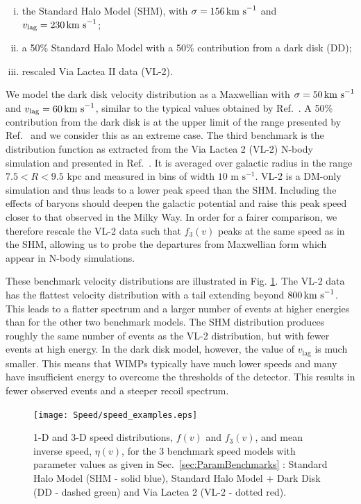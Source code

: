 \begin{enumerate}[(i)]
\item the Standard Halo Model (SHM), with \(\sigma = 156 \,\textrm{km s}^{-1}\) and \(v_\textrm{lag} = 230 \,\textrm{km s}^{-1}\);
\item a 50\% Standard Halo Model with a 50\% contribution from a dark disk (DD);
\item rescaled Via Lactea II data (VL-2).
\end{enumerate}

We model the dark disk velocity distribution as a Maxwellian with \(\sigma = 50 \,\textrm{km s}^{-1}\) and \(v_\textrm{lag} = 60 \,\textrm{km s}^{-1}\), similar to the typical values obtained by Ref.\ \cite{Purcell:2009}. A 50\% contribution from the dark disk is at the upper limit of the range presented by Ref.\ \cite{DMA55} and we consider this as an extreme case. The third benchmark is the distribution function as extracted from the Via Lactea 2 (VL-2) N-body simulation \cite{Diemand:2008} and presented in Ref.\ \cite{Kuhlen:2010}. It is averaged over galactic radius in the range \(7.5 < R < 9.5 \textrm{ kpc}\) and measured in bins of width \(10 \textrm{ m s}^{-1}\). VL-2 is a DM-only simulation and thus leads to a lower peak speed than the SHM. Including the effects of baryons should deepen the galactic potential and raise this peak speed closer to that observed in the Milky Way. In order for a fairer comparison, we therefore rescale the VL-2 data such that \(f_3(v)\) peaks at the same speed as in the SHM, allowing us to probe the departures from Maxwellian form which appear in N-body simulations.

These benchmark velocity distributions are illustrated in Fig. \ref{fig:Speed:benchmarkf}. The VL-2 data has the flattest velocity distribution with a tail extending beyond \(800 \,\textrm{km s}^{-1}\). This leads to a flatter spectrum and a larger number of events at higher energies than for the other two benchmark models. The SHM distribution produces roughly the same number of events as the VL-2 distribution, but with fewer events at high energy. In the dark disk model, however, the value of \(v_\textrm{lag}\) is much smaller. This means that WIMPs typically have much lower speeds and many have insufficient energy to overcome the thresholds of the detector. This results in fewer observed events and a steeper recoil spectrum.

 \begin{figure}[t]
\centering
\texttt{[image: Speed/speed\_examples.eps]}
\caption[Speed distributions and mean inverse speeds for the Standard Halo Model (SHM), SHM + Dark disk (SHM+DD) and Via Lactea 2 (VL-2) distribution functions]{1-D and 3-D speed distributions, \(f(v)\) and \(f_3(v)\),  and mean inverse speed, \(\eta(v)\), for the 3 benchmark speed models with parameter values as given in Sec.\ \ref{sec:ParamBenchmarks} : Standard Halo Model (SHM - solid blue), Standard Halo Model + Dark Disk (DD - dashed green) and Via Lactea 2 (VL-2 - dotted red). }
  \label{fig:Speed:benchmarkf}
\end{figure}



